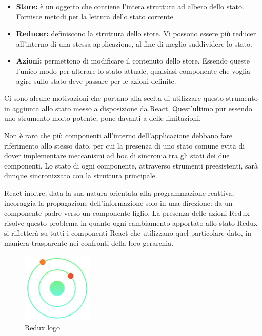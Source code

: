 \begin{itemize}
  \item \textbf{Store:} è un oggetto che contiene l'intera struttura ad albero dello stato.\cite{store_redux} Fornisce metodi per la lettura dello stato corrente.
  \item \textbf{Reducer:} definiscono la struttura dello store.\cite{reducer_redux} Vi possono essere più reducer all'interno di una stessa applicazione, al fine di meglio suddividere lo stato.
  \item \textbf{Azioni:} permettono di modificare il contenuto dello store.\cite{azioni_redux} Essendo queste l'unico modo per alterare lo stato attuale, qualsiasi componente che voglia agire sullo stato deve passare per le azioni definite.
\end{itemize}
Ci sono alcune motivazioni che portano alla scelta di utilizzare questo strumento in aggiunta allo stato messo a disposizione da React. Quest'ultimo pur essendo uno strumento molto potente, pone davanti a delle limitazioni.

Non è raro che più componenti all'interno dell'applicazione debbano fare riferimento allo stesso dato, per cui la presenza di uno stato comune evita di dover implementare meccanismi ad hoc di sincronia tra gli stati dei due componenti. Lo stato di ogni componente, attraverso strumenti preesistenti, sarà dunque sincronizzato con la struttura principale.

React inoltre, data la sua natura orientata alla programmazione reattiva, incoraggia la propagazione dell'informazione solo in una direzione: da un componente padre verso un componente figlio. La presenza delle azioni Redux risolve questo problema in quanto ogni cambiamento apportato allo stato Redux si rifletterà su tutti i componenti React che utilizzano quel particolare dato, in maniera trasparente nei confronti della loro gerarchia.

\begin{figure}[H]
\centering
\includegraphics[width=0.3\textwidth]{img/logos/redux_devtool.jpg}
\caption{Redux logo}
\label{fig:redux}
\end{figure}


